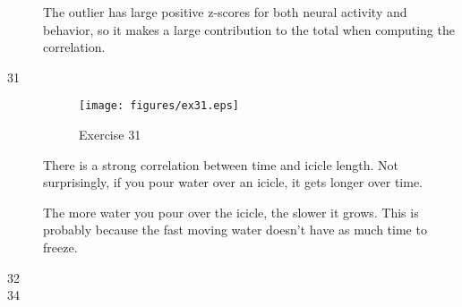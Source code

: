 \documentclass[letterpaper, landscape]{exam}
\begin{document}
\begin{description}
\begin{parts}
            The outlier has large positive z-scores for both neural activity and
            behavior, so it makes a large contribution to the total when computing
            the correlation.

        \end{parts}

      \item[31]
        \begin{figure}[H]
          \centering
          \texttt{[image: figures/ex31.eps]}
          \caption{Exercise 31}
        \end{figure}

        There is a strong correlation between time and icicle length.  Not
        surprisingly, if you pour water over an icicle, it gets longer over
        time.

        The more water you pour over the icicle, the slower it grows.  This is
        probably because the fast moving water doesn't have as much time to
        freeze.

      \item[32]

      \item[34]
\end{description}
\end{document}

